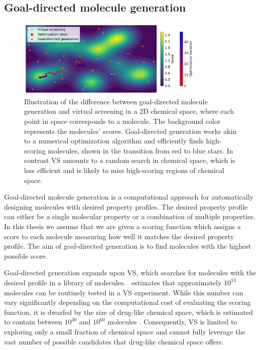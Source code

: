\subsection{Goal-directed molecule generation}
\begin{figure}
      \centering
      \includegraphics[width=0.8\textwidth]{./figures/goal_directed_generation_vs.pdf}
      \caption{Illustration of the difference between goal-directed molecule generation and virtual
            screening in a 2D chemical space, where each point in space corresponds to a molecule. The
            background color represents the molecules' scores. Goal-directed generation works
            akin to a numerical optimization algorithm and efficiently finds high-scoring molecules,
            shown in the transition from red to blue stars. In contrast VS amounts to a random search in chemical space, which is less efficient
            and is likely to miss high-scoring regions of chemical space. \label{fig:goal-directed-generation}}
\end{figure}

Goal-directed molecule generation \citep{schneiderNovoMolecularDesign2013} is a computational
approach for automatically designing molecules with desired property profiles. The desired
property profile can either be a single molecular property or a combination of multiple properties.
In this thesis we assume that we are given a scoring function which assigns a score to each molecule
measuring how well it matches the desired property profile. The aim of goal-directed generation is
to find molecules with the highest possible score.

Goal-directed generation expands upon \ac{VS}, which searches for molecules with the desired profile
in a library of molecules.\ \citet{waltersVirtualChemicalLibraries2019} estimates that approximately
$10^{13}$ molecules can be routinely tested in a \ac{VS} experiment. While this number can vary
significantly depending on the computational cost of evaluating the scoring function, it is dwarfed
by the size of drug-like chemical space, which is estimated to contain between $10^{30}$ and
$10^{60}$ molecules \citep{waltersVirtualChemicalLibraries2019,ruddigkeitEnumeration166Billion2012}.
Consequently, \ac{VS} is limited to exploring only a small fraction of chemical space and cannot
fully leverage the vast number of possible candidates that drug-like chemical space offers.

